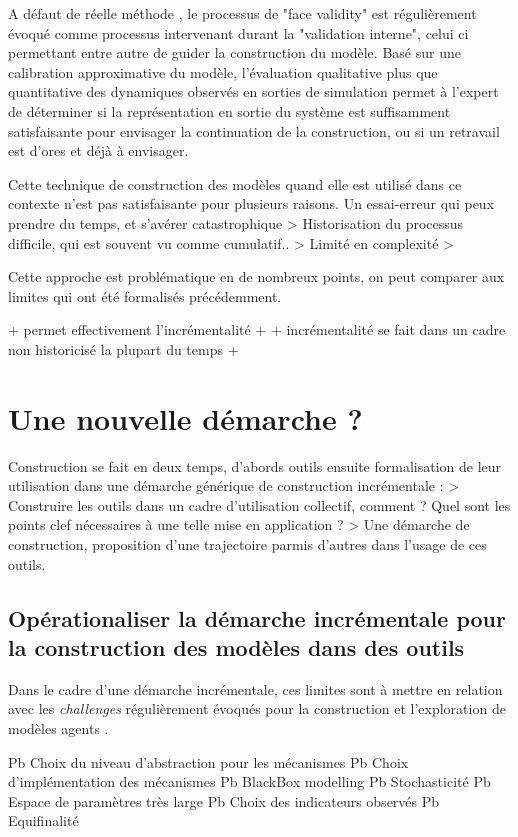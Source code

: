 A défaut de réelle méthode , le processus de "face validity" est régulièrement évoqué comme processus intervenant durant la "validation interne", celui ci permettant entre autre de guider la construction du modèle. Basé sur une calibration approximative du modèle, l'évaluation qualitative plus que quantitative des dynamiques observés en sorties de simulation permet à l'expert de déterminer si la représentation en sortie du système est suffisamment  satisfaisante pour envisager la continuation de la construction, ou si un retravail est d'ores et déjà à envisager.

Cette technique de construction des modèles quand elle est utilisé dans ce contexte n'est pas satisfaisante pour plusieurs raisons. Un essai-erreur qui peux prendre du temps, et s'avérer catastrophique
> Historisation du processus difficile, qui est souvent vu comme cumulatif.. 
> Limité en complexité
> 

Cette approche est problématique en de nombreux points, on peut comparer aux limites qui ont été formalisés précédemment.

+ permet effectivement l'incrémentalité +
+ incrémentalité se fait dans un cadre non historicisé la plupart du temps +

\section{Une nouvelle démarche ?}

Construction se fait en deux temps, d'abords outils ensuite formalisation de leur utilisation dans une démarche générique de construction incrémentale : 
> Construire les outils dans un cadre d'utilisation collectif, comment ? Quel sont les points clef nécessaires à une telle mise en application ?
> Une démarche de construction, proposition d'une trajectoire parmis d'autres dans l'usage de ces outils.

\subsection{Opérationaliser la démarche incrémentale pour la construction des modèles dans des outils }

Dans le cadre d'une démarche incrémentale, ces limites sont à mettre en relation avec les \textit{challenges} régulièrement évoqués pour la construction et l'exploration de modèles agents \autocite{Doran2000} \autocite{Crooks2008}.

Pb Choix du niveau d'abstraction pour les mécanismes
Pb Choix d'implémentation des mécanismes
Pb BlackBox modelling
Pb Stochasticité
Pb Espace de paramètres très large
Pb Choix des indicateurs observés
Pb Equifinalité

